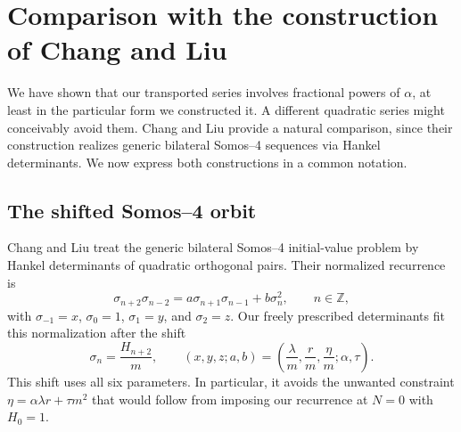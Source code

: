 \documentclass[11pt]{article}
\theoremstyle{definition}
\theoremstyle{remark}
\begin{document}
\section{Comparison with the construction of Chang and Liu}
We have shown that our transported series involves fractional powers of $\alpha$,
at least in the particular form we constructed it. A different quadratic series
might conceivably avoid them. Chang and Liu provide a natural comparison, since
their construction realizes generic bilateral Somos--4 sequences via Hankel
determinants. We now express both constructions in a common notation.

\subsection{The shifted Somos--4 orbit}
Chang and Liu \cite[Sections~3.3--4.2]{ChangLiu2026} treat the generic bilateral Somos--4 initial-value problem by Hankel determinants of quadratic orthogonal pairs. Their normalized recurrence is
\begin{equation}
 \sigma_{n+2}\sigma_{n-2}=a\sigma_{n+1}\sigma_{n-1}+b\sigma_n^2,
 \qquad n\in\mathbb Z,
 \label{eq:CL-recurrence}
\end{equation}
with $\sigma_{-1}=x$, $\sigma_0=1$, $\sigma_1=y$, and $\sigma_2=z$.
Our freely prescribed determinants fit this normalization after the shift
\begin{equation}
 \sigma_n=\frac{H_{n+2}}m,
 \qquad
 (x,y,z;a,b)=\left(\frac\lambda m,\frac r m,\frac\eta m;\alpha,\tau\right).
 \label{eq:CL-dictionary}
\end{equation}
This shift uses all six parameters.  In particular, it avoids the unwanted constraint
$\eta=\alpha\lambda r+\tau m^2$ that would follow from imposing our recurrence at $N=0$ with $H_0=1$.
\end{document}
